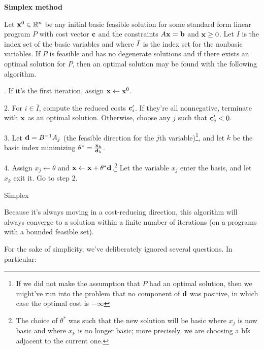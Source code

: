 \documentclass{paper}
\newenvironment{bbox}{\begin{tcolorbox}[breakable,colback=blue!10!white,colframe=blue!10!black]}{\end{tcolorbox}}
\begin{document}
\bigskip
\begin{bbox}
    \textbf{Simplex method}
    \medskip
    
    Let $\bold{x}^0 \in \mathbb{R}^n$ be any initial basic feasible solution for some standard form linear program $P$ with cost vector $\bold{c}$ and the constraints $A\bold{x} = \bold{b}$ and $\bold{x} \geq 0$. Let $I$ is the index set of the basic variables and where $\Bar{I}$ is the index set for the nonbasic variables. If $P$ is feasible and has no degenerate solutions and if there exists an optimal solution for $P$, then an optimal solution may be found with the following algorithm.
    
    \medskip
    \begin{algorithm}[H]
        . If it's the first iteration, assign $\bold{x} \leftarrow \bold{x}^0$.
        
        2. For $i \in \bar{I}$, compute the reduced costs $\bold{c}'_i$. If they're all nonnegative, terminate with $\bold{x}$ as an optimal solution. Otherwise, choose any $j$ such that $\bold{c}'_j < 0$.
        
        3. Let $\bold{d} = B^{-1}A_j$ (the feasible direction for the $j$th variable)\footnote{If we did not make the assumption that $P$ had an optimal solution, then we might've run into the problem that no component of $\bold{d}$ was positive, in which case the optimal cost is $-\infty$}, and let $k$ be the basic index minimizing $\theta^* = \frac{\bold{x}_k}{\bold{d}_k}$.
        
        4. Assign $x_j \leftarrow \theta$ and $\bold{x} \leftarrow \bold{x} + \theta^* \bold{d}$.\footnote{The choice of $\theta^*$ was such that the new solution will be basic where $x_j$ is now basic and where $x_k$ is no longer basic; more precisely, we are choosing a bfs adjacent to the current one.} Let the variable $x_j$ enter the basis, and let $x_k$ exit it. Go to step $2$.   
        
        \caption{Simplex}
    \end{algorithm}
    
    \medskip
    Because it's always moving in a cost-reducing direction, this algorithm will always converge to a solution within a finite number of iterations (on a programs with a bounded feasible set).
\end{bbox}

\bigskip
For the sake of simplicity, we've deliberately ignored several questions. In particular:
\end{document}
